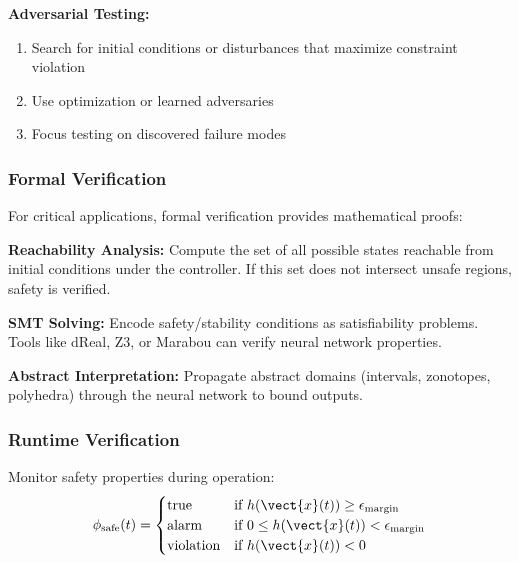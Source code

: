 \textbf{Adversarial Testing:}
\begin{enumerate}
    \item Search for initial conditions or disturbances that maximize constraint violation
    \item Use optimization or learned adversaries
    \item Focus testing on discovered failure modes
\end{enumerate}

\subsubsection{Formal Verification}

For critical applications, formal verification provides mathematical proofs:

\textbf{Reachability Analysis:} Compute the set of all possible states reachable from initial conditions under the controller. If this set does not intersect unsafe regions, safety is verified.

\textbf{SMT Solving:} Encode safety/stability conditions as satisfiability problems. Tools like dReal, Z3, or Marabou can verify neural network properties.

\textbf{Abstract Interpretation:} Propagate abstract domains (intervals, zonotopes, polyhedra) through the neural network to bound outputs.


\subsubsection{Runtime Verification}

Monitor safety properties during operation:
\begin{equation}
\phi_{\text{safe}}(t) = \begin{cases}
\text{true} & \text{if } h(\vect{x}(t)) \geq \epsilon_{\text{margin}} \\
\text{alarm} & \text{if } 0 \leq h(\vect{x}(t)) < \epsilon_{\text{margin}} \\
\text{violation} & \text{if } h(\vect{x}(t)) < 0
\end{cases}
\end{equation}

